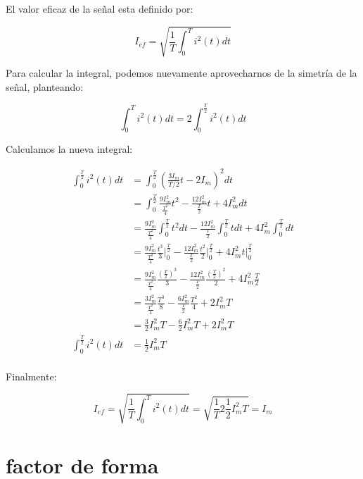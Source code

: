 El valor eficaz de la señal esta definido por:

\begin{equation}
  I_{ef}= \sqrt{ \frac{1}{T} \int_0^T i^2(t) dt }
\end{equation}

Para calcular la integral, podemos nuevamente aprovecharnos de la simetría de la señal, planteando:

\begin{equation}
  \int_0^T i^2(t) dt = 2 \int_0^{\frac{T}{2}} i^2(t) dt
\end{equation}

Calculamos la nueva integral:

\begin{align*}
  \int_0^{\frac{T}{2}} i^2(t) dt &= \int_0^{\frac{T}{2}} \left(\frac{3I_m}{T/2} t - 2I_m\right)^2 dt\\
  &= \int_0^{\frac{T}{2}} \frac{9I_m^2}{\frac{T^2}{4}} t^2 - \frac{12 I_m^2}{\frac{T}{2}} t + 4I_m^2 dt\\
  &= \frac{9I_m^2}{\frac{T^2}{4}} \int_0^{\frac{T}{2}} t^2 dt - \frac{12 I_m^2}{\frac{T}{2}} \int_0^{\frac{T}{2}} t dt + 4I_m^2 \int_0^{\frac{T}{2}} dt\\
  &= \frac{9I_m^2}{\frac{T^2}{4}} \frac{t^3}{3} \bigg|_0^{\frac{T}{2}} - \frac{12 I_m^2}{\frac{T}{2}} \frac{t^2}{2} \bigg|_0^{\frac{T}{2}} + 4I_m^2 t \Big|_0^{\frac{T}{2}} \\
  &= \frac{9I_m^2}{\frac{T^2}{4}} \frac{\left(\frac{T}{2}\right)^3}{3} - \frac{12 I_m^2}{\frac{T}{2}} \frac{\left(\frac{T}{2}\right)^2}{2} + 4I_m^2 \frac{T}{2} \\
  &= \frac{3I_m^2}{\frac{T^2}{4}} \frac{T^3}{8} - \frac{6 I_m^2}{\frac{T}{2}} \frac{T^2}{4} + 2I_m^2 T \\
  &= \frac{3}{2} I_m^2T - \frac{6}{2} I_m^2 T + 2I_m^2 T \\
  \int_0^{\frac{T}{2}} i^2(t) dt &= \frac{1}{2} I_m^2 T\\
\end{align*}

Finalmente:

\begin{equation}
  I_{ef}= \sqrt{ \frac{1}{T} \int_0^T i^2(t) dt } = \sqrt{ \frac{1}{T} 2 \frac{1}{2} I_m^2 T} = I_m
\end{equation}

\section{factor de forma}

